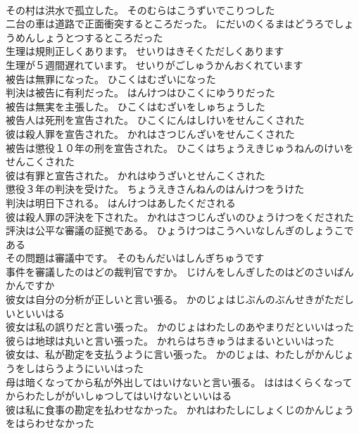 \documentclass[8pt]{extreport}
\begin{document}
\begin{CJK}{UTF8}{min}
\\	その村は洪水で孤立した。	そのむらはこうずいでこりつした 
\\	二台の車は道路で正面衝突するところだった。	にだいのくるまはどうろでしょうめんしょうとつするところだった 
\\	生理は規則正しくあります。	せいりはきそくただしくあります 
\\	生理が５週間遅れています。	せいりがごしゅうかんおくれています 
\\	被告は無罪になった。	ひこくはむざいになった 
\\	判決は被告に有利だった。	はんけつはひこくにゆうりだった 
\\	被告は無実を主張した。	ひこくはむざいをしゅちょうした 
\\	被告人は死刑を宣告された。	ひこくにんはしけいをせんこくされた 
\\	彼は殺人罪を宣告された。	かれはさつじんざいをせんこくされた 
\\	被告は懲役１０年の刑を宣告された。	ひこくはちょうえきじゅうねんのけいをせんこくされた 
\\	彼は有罪と宣告された。	かれはゆうざいとせんこくされた 
\\	懲役３年の判決を受けた。	ちょうえきさんねんのはんけつをうけた 
\\	判決は明日下される。	はんけつはあしたくだされる 
\\	彼は殺人罪の評決を下された。	かれはさつじんざいのひょうけつをくだされた 
\\	評決は公平な審議の証拠である。	ひょうけつはこうへいなしんぎのしょうこである 
\\	その問題は審議中です。	そのもんだいはしんぎちゅうです 
\\	事件を審議したのはどの裁判官ですか。	じけんをしんぎしたのはどのさいばんかんですか 
\\	彼女は自分の分析が正しいと言い張る。	かのじょはじぶんのぶんせきがただしいといいはる 
\\	彼女は私の誤りだと言い張った。	かのじょはわたしのあやまりだといいはった 
\\	彼らは地球は丸いと言い張った。	かれらはちきゅうはまるいといいはった 
\\	彼女は、私が勘定を支払うように言い張った。	かのじょは、わたしがかんじょうをしはらうようにいいはった 
\\	母は暗くなってから私が外出してはいけないと言い張る。	はははくらくなってからわたしががいしゅつしてはいけないといいはる 
\\	彼は私に食事の勘定を払わせなかった。	かれはわたしにしょくじのかんじょうをはらわせなかった 

\end{CJK}
\end{document}
